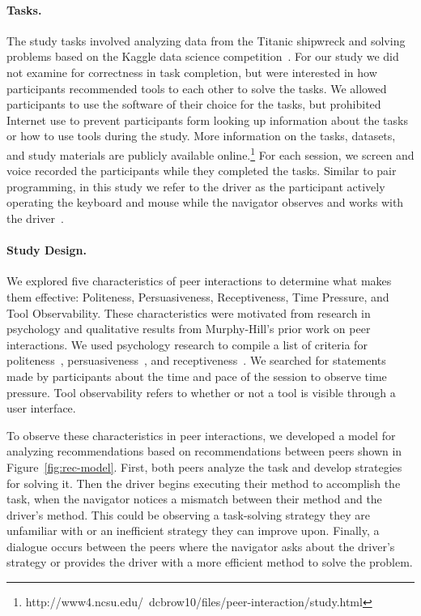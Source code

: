 \paragraph{Tasks.} The study tasks involved analyzing data from the Titanic shipwreck and solving problems based on the Kaggle data science competition~\cite{KaggleTitanic}. For our study we did not examine for correctness in task completion, but were interested in how participants recommended tools to each other to solve the tasks. We allowed participants to use the software of their choice for the tasks, but prohibited Internet use to prevent participants form looking up information about the tasks or how to use tools during the study. More information on the tasks, datasets, and study materials are publicly available online.\footnote{http://www4.ncsu.edu/~dcbrow10/files/peer-interaction/study.html} For each session, we screen and voice recorded the participants while they completed the tasks. Similar to pair programming, in this study we refer to the driver as the participant actively operating the keyboard and mouse while the navigator observes and works with the driver~\cite{WilliamsPairProgramming}.

\paragraph{Study Design.} We explored five characteristics of peer interactions to determine what makes them effective: Politeness, Persuasiveness, Receptiveness, Time Pressure, and Tool Observability. These characteristics were motivated from research in psychology and qualitative results from Murphy-Hill's prior work on peer interactions. We used psychology research to compile a list of criteria for politeness~\cite{LeechPolite}, persuasiveness~\cite{ShenPersuasive}, and receptiveness~\cite{FoggPersuasiveTech}. We searched for statements made by participants about the time and pace of the session to observe time pressure. Tool observability refers to whether or not a tool is visible through a user interface. 

To observe these characteristics in peer interactions, we developed a model for analyzing recommendations based on recommendations between peers shown in Figure~\ref{fig:rec-model}. First, both peers analyze the task and develop strategies for solving it. Then the driver begins executing their method to accomplish the task, when the navigator notices a mismatch between their method and the driver's method. This could be observing a task-solving strategy they are unfamiliar with or an inefficient strategy they can improve upon. Finally, a dialogue occurs between the peers where the navigator asks about the driver's strategy or provides the driver with a more efficient method to solve the problem.

